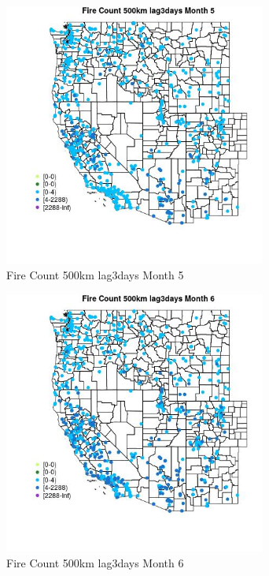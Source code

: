 \begin{figure} 
\centering  
\includegraphics[width=0.77\textwidth]{Code_Outputs/Report_ML_input_PM25_Step4_part_e_de_duplicated_aves_compiled_2019-05-21wNAs_MapObsMo5Fire_Count_500km_lag3days.jpg} 
\caption{\label{fig:Report_ML_input_PM25_Step4_part_e_de_duplicated_aves_compiled_2019-05-21wNAsMapObsMo5Fire_Count_500km_lag3days}Fire Count 500km lag3days Month 5} 
\end{figure} 
 

\begin{figure} 
\centering  
\includegraphics[width=0.77\textwidth]{Code_Outputs/Report_ML_input_PM25_Step4_part_e_de_duplicated_aves_compiled_2019-05-21wNAs_MapObsMo6Fire_Count_500km_lag3days.jpg} 
\caption{\label{fig:Report_ML_input_PM25_Step4_part_e_de_duplicated_aves_compiled_2019-05-21wNAsMapObsMo6Fire_Count_500km_lag3days}Fire Count 500km lag3days Month 6} 
\end{figure} 
 

